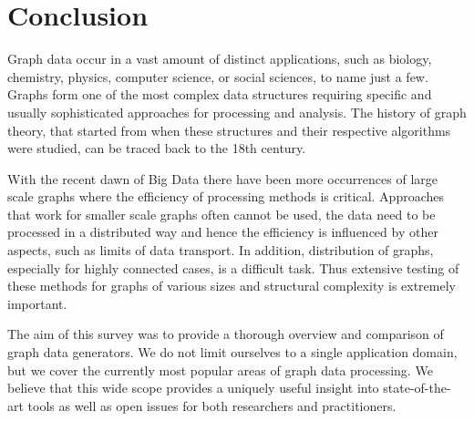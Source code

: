 \section{Conclusion}
\label{sec:conclusion}

Graph data occur in a vast amount of distinct applications, such as biology, chemistry, physics, computer science, or social sciences, to name just a few. Graphs form one of the most complex data structures requiring specific and usually sophisticated approaches for processing and analysis. The history of graph theory,  that started from when these structures and their respective algorithms were studied, can be traced back to the 18th century.

With the recent dawn of Big Data there have  been more occurrences of large scale graphs where the efficiency   of  processing methods is critical.  Approaches that work for smaller scale graphs often cannot be used, the data need to be processed in a distributed way and hence the efficiency is influenced by other aspects, such as limits of data transport. In addition, distribution of graphs, especially for highly connected cases, is a difficult task. Thus extensive testing of these methods for graphs of various sizes and structural complexity is extremely important.

The aim of this survey was to provide a thorough overview and comparison of graph data generators. We do not limit ourselves to a single application domain, but we cover the currently most popular areas of graph data processing. We believe that this wide scope provides a uniquely useful insight into state-of-the-art tools as well as open issues for both researchers and practitioners.

